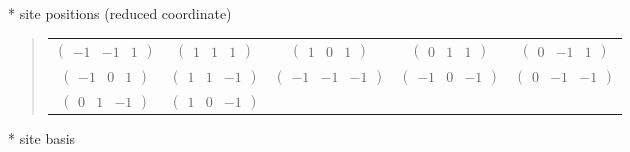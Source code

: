 \documentclass[fleqn,9pt,landscape]{jsarticle}
\begin{document}
* site positions (reduced coordinate)
\begin{quote}
\begin{tabular}{ccccc}
$ \begin{pmatrix} -1 & -1 & 1 \end{pmatrix} $ & $ \begin{pmatrix} 1 & 1 & 1 \end{pmatrix} $ & $ \begin{pmatrix} 1 & 0 & 1 \end{pmatrix} $ & $ \begin{pmatrix} 0 & 1 & 1 \end{pmatrix} $ & $ \begin{pmatrix} 0 & -1 & 1 \end{pmatrix} $ \\
$ \begin{pmatrix} -1 & 0 & 1 \end{pmatrix} $ & $ \begin{pmatrix} 1 & 1 & -1 \end{pmatrix} $ & $ \begin{pmatrix} -1 & -1 & -1 \end{pmatrix} $ & $ \begin{pmatrix} -1 & 0 & -1 \end{pmatrix} $ & $ \begin{pmatrix} 0 & -1 & -1 \end{pmatrix} $ \\
$ \begin{pmatrix} 0 & 1 & -1 \end{pmatrix} $ & $ \begin{pmatrix} 1 & 0 & -1 \end{pmatrix} $ & $  $ & $  $ & $  $
\end{tabular}
\end{quote}
* site basis
\end{document}
